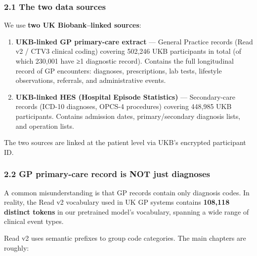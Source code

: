 \documentclass[
  11pt,
]{article}
\providecommand{\tightlist}{%
  \setlength{\itemsep}{0pt}\setlength{\parskip}{0pt}}
\begin{document}
\subsubsection{2.1 The two data sources}\label{the-two-data-sources}

We use \textbf{two UK Biobank--linked sources}:

\begin{enumerate}
\def\labelenumi{\arabic{enumi}.}
\tightlist
\item
  \textbf{UKB-linked GP primary-care extract} --- General Practice
  records (Read v2 / CTV3 clinical coding) covering 502,246 UKB
  participants in total (of which 230,001 have ≥1 diagnostic record).
  Contains the full longitudinal record of GP encounters: diagnoses,
  prescriptions, lab tests, lifestyle observations, referrals, and
  administrative events.
\item
  \textbf{UKB-linked HES (Hospital Episode Statistics)} ---
  Secondary-care records (ICD-10 diagnoses, OPCS-4 procedures) covering
  448,985 UKB participants. Contains admission dates, primary/secondary
  diagnosis lists, and operation lists.
\end{enumerate}

The two sources are linked at the patient level via UKB's encrypted
participant ID.

\subsubsection{2.2 GP primary-care record is NOT just
diagnoses}\label{gp-primary-care-record-is-not-just-diagnoses}

A common misunderstanding is that GP records contain only diagnosis
codes. In reality, the Read v2 vocabulary used in UK GP systems contains
\textbf{108,118 distinct tokens} in our pretrained model's vocabulary,
spanning a wide range of clinical event types.

Read v2 uses semantic prefixes to group code categories. The main
chapters are roughly:
\end{document}
